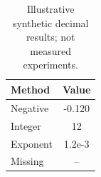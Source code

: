 \begin{table}[t]
\centering
\caption{Illustrative synthetic decimal results; not measured experiments.}
\label{tab:decimal}
\begin{tabular}{@{}lS@{}}
\toprule
Method & {Value} \\
\midrule
Negative & -0.120 \\
Integer & 12 \\
Exponent & 1.2e-3 \\
Missing &  \\
\bottomrule
\end{tabular}
\end{table}
